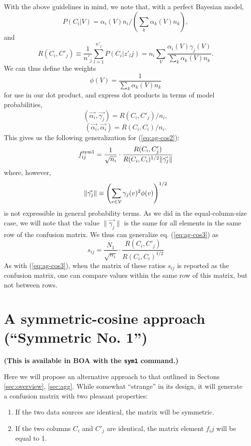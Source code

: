 \documentclass[12pt]{article}
\begin{document}
With the above guidelines in mind, we note that, with a perfect Bayesian model, 
$$P(C_i|V)=\alpha_i(V) n_i / (\sum_k \alpha_k(V) n_k),
$$
and
\begin{equation}
\label{eq:R-def2}
R(C_i,C'_j)\equiv \frac{1}{n'_j}\sum_{l=1}^{n'_j} P(C_i|z'_lj)  =
n_i \sum_V \frac{\alpha_i(V)\gamma_j(V)}{\sum_k \alpha_k(V) n_k}.
\end{equation}
We can thus define the weights 
$$
\phi(V) =  \frac{1}{\sum_k \alpha_k(V) n_k}
$$ for use in our dot product, and express dot products in terms of
model probabilities,
$$
(\vec{\alpha_i}, \vec{\gamma_j}) = R(C_i,C'_j)/n_i,
$$
$$
(\vec{\alpha_i}, \vec{\alpha_i}) = R(C_i,C_i)/n_i.
$$
This gives us the following generalization for (\ref{eq:ag-cos2}): 
\begin{equation}
\label{eq:ag-cos-gen-2}
f_{ij}^{\rm sym 1} =
\frac{1}{\sqrt{n_i}} \cdot 
\frac{ R(C_i,C'_j) }{ R(C_i,C_i)^{1/2} \|\vec{\gamma_j}\|}
\end{equation}
where, however,
$$
\|\vec{\gamma_j}\| \equiv \left(\sum_{v\in \cal{V}}{\gamma_j(v)^2  \phi(v)}\right)^{1/2}
$$ is not expressible in general probability terms. As we did in the
equal-column-size case, we will note that the value
$\|\vec{\gamma_j}\|$ is the same for all elements in the same row of
the confusion matrix. We thus can generalize eq. (\ref{eq:ag-cos3}) as
\begin{equation}
\label{eq:ag-cos-gen-3}
s_{ij} = \frac{N_1}{\sqrt{n_i}} \cdot 
 \frac{ R(C_i,C'_j) }{ R(C_i,C_i)^{1/2} }
\end{equation}
As with (\ref{eq:ag-cos3}), when the matrix of these ratios $s_{ij}$
is reported as the confusion matrix, one can compare values within the
same row of this matrix, but not between rows. 

\section{A symmetric-cosine approach (``Symmetric No. 1'')}

{\bf (This is available in BOA with the {\tt sym1} command.)}

Here we will propose an alternative approach to that outlined in
Sectons \ref{sec:overview}, \ref{sec:agg}. While somewhat ``strange''
in its design, it will generate a confusion matrix with two pleasant
properties:
\begin{enumerate}
\item If the two data sources are identical, the matrix will be symmetric.
\item If the two columns $C_i$ and $C'_j$ are identical, the matrix element $f_ij$ will be equal to 1.
\end{enumerate}
\end{document}
